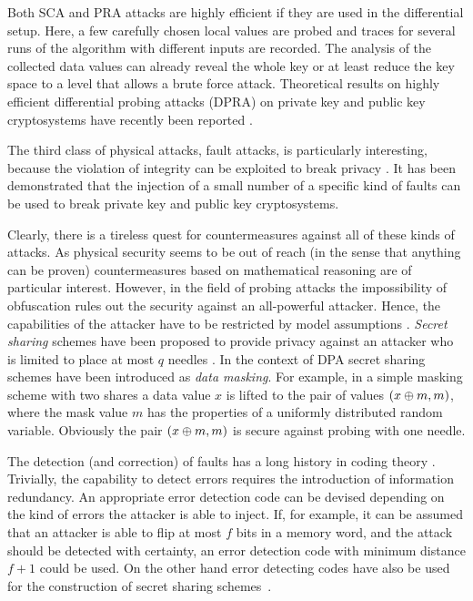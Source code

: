 \documentclass[11pt]{llncs}
\begin{document}
Both SCA and PRA attacks are highly efficient if they are used
in the differential setup. Here, a few carefully chosen local values
are probed and traces for several runs of the algorithm
with different inputs are recorded.
The analysis of the collected data values can already reveal
the whole key or at least reduce the key space
to a level that allows a brute force attack.
Theoretical results on highly efficient differential probing attacks (DPRA) on
private key and public key cryptosystems have recently been reported
\cite{Handschuh1999ProbingAttackson,Schmidt2009ProbingAttackAES}.

The third class of physical attacks, fault attacks, is
particularly interesting, because the violation of integrity
can be exploited to break privacy
\cite{Anderson1996TamperResistance-,Skorobogatov2003OpticalFaultInduction}.
It has been demonstrated that the injection of a small
number of a specific kind of faults can be used to break
private key
\cite{Biham1997DifferentialFaultAnalysis}
and public key
\cite{Boneh2001ImportanceofEliminating}
cryptosystems.

Clearly, there is a tireless quest for countermeasures against all
of these kinds of attacks. As physical security seems to be out of
reach (in the sense that anything can be proven) countermeasures
based on mathematical reasoning are of particular interest. However,
in the field of probing attacks the impossibility of obfuscation
\cite{Barak2001Impossibilityofobfuscating} rules out the security
against an all-powerful attacker. Hence, the capabilities of the
attacker have to be restricted by model assumptions
\cite{Micali2004PhysicallyObservableCryptography}. \emph{Secret
sharing} schemes have been proposed to provide privacy against an
attacker who is limited to place at most $q$ needles
\cite{Ishai2003PrivateCircuits:Securing}. In the context of DPA
secret sharing schemes have been introduced as \emph{data masking}.
For example, in a simple masking scheme with two shares a data value
$x$ is lifted to the pair of values $(x \oplus m, m)$, where the mask
value $m$ has the properties of a uniformly distributed random
variable. Obviously the pair $(x \oplus m, m)$ is secure against
probing with one needle.

The detection (and correction) of faults has a
long history in coding theory
\cite{MacWilliams2006TheoryofError-Correcting,Shannon1949CommunicationTheoryof}.
Trivially, the capability to detect errors requires the
introduction of information redundancy.
An appropriate error detection code can be devised depending on
the kind of errors the attacker is able to inject.
If, for example, it can be assumed that an attacker is able to
flip at most $f$ bits in a memory word, and the attack
should be detected with certainty, an error detection
code with minimum distance $f+1$ could be used.
On the other hand
error detecting codes have also be used for the construction of
secret sharing schemes~\cite{Massey1993MinimalCodewordsand}.
\end{document}
